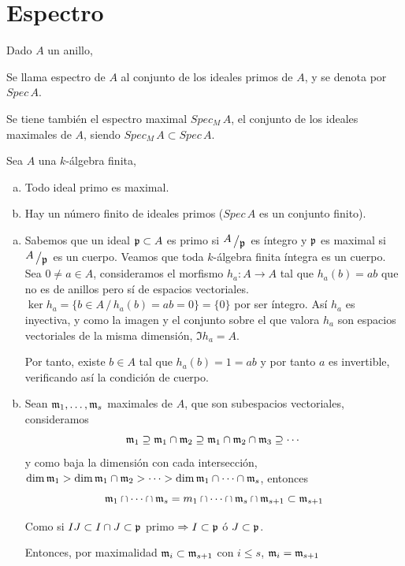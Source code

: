     \section{Espectro}
    Dado $A$ un anillo, 
    \begin{defi} Se llama espectro de $A$ al conjunto de los ideales primos de $A$, y se denota por $Spec \, A$. 

    Se tiene tambi\'en el espectro maximal $Spec_M \, A$, el conjunto de los ideales maximales de $A$, siendo $Spec_M \, A \subset Spec \, A$.
    \end{defi}
    \begin{teo}
    Sea $A$ una $k$-\'algebra finita,
    \begin{enumerate}[a)]
        \item Todo ideal primo es maximal.
        \item Hay un n\'umero finito de ideales primos ($Spec\, A$ es un conjunto finito). 
    \end{enumerate}
    \end{teo}
    \begin{dem}
        \begin{enumerate}[a)]
            \item Sabemos que un ideal $\mathfrak{p} \subset A$ es primo si $\modulo{A}{\p}$ es \'integro y $\mathfrak{p}$ es maximal si $\modulo{A}{\p}$ es un cuerpo. Veamos que toda $k$-\'algebra finita \'integra es un cuerpo. Sea $0\neq a\in A$, consideramos el morfismo $h_a: A \longrightarrow A$ tal que $h_a(b) = ab$ que no es de anillos pero s\'i de espacios vectoriales. $\ker h_a = \{b\in A \, / \, h_a(b) = ab=0\} = \{0\}$ por ser \'integro. As\'i $h_a$ es inyectiva, y como la imagen y el conjunto sobre el que valora $h_a$ son espacios vectoriales de la misma dimensi\'on, $\Im h_a = A$. 
            
            Por tanto, existe $b \in A$ tal que $h_a(b) = 1 = ab$ y por tanto $a$ es invertible, verificando as\'i la condici\'on de cuerpo. 
            \item Sean $\mathfrak{m}_1, \ldots, \mathfrak{m}_s$ maximales de $A$, que son subespacios vectoriales, consideramos
            $$\mathfrak{m}_1\supseteq \mathfrak{m}_1 \cap \mathfrak{m}_2 \supseteq \mathfrak{m}_1 \cap \mathfrak{m}_2 \cap \mathfrak{m}_3 \supseteq \cdots$$
            y como baja la dimensi\'on con cada intersecci\'on, $\dim \mathfrak{m}_1 > \dim \mathfrak{m}_1 \cap \mathfrak{m}_2 > \cdots > \dim \mathfrak{m}_1 \cap \cdots \cap \mathfrak{m}_s $, entonces 
            $$\mathfrak{m}_1 \cap \cdots \cap \mathfrak{m}_s = m_1  \cap \cdots \cap \mathfrak{m}_s \cap \mathfrak{m}_{s+1} \subset \mathfrak{m}_{s+1} $$

            Como si $IJ\subset I \cap J \subset \mathfrak{p}$ primo $\Rightarrow I \subset \mathfrak{p}$ \'o $J \subset \mathfrak{p}$. 

            Entonces, por maximalidad $\mathfrak{m}_i \subset \mathfrak{m}_{s+1}$ con $i \leq s$, $\mathfrak{m}_i = \mathfrak{m}_{s+1}$
        \end{enumerate}
    \end{dem}
